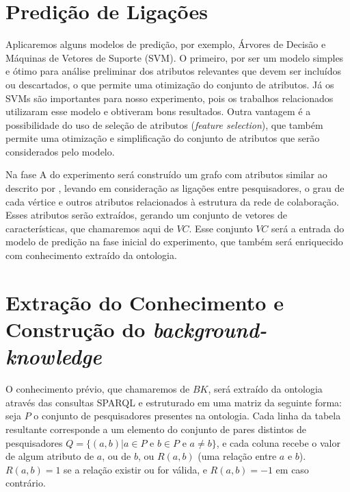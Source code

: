 \section{Predição de Ligações}
\label{sec:desenvolvimento-predicao}

Aplicaremos alguns modelos de predição, por exemplo, Árvores de Decisão e  Máquinas de Vetores de Suporte (SVM). O primeiro, por ser um modelo simples e ótimo para análise preliminar dos atributos relevantes que devem ser incluídos ou descartados, o que permite uma otimização do conjunto de atributos. Já os SVMs são importantes para nosso experimento, pois os trabalhos relacionados utilizaram esse modelo e obtiveram bons resultados. Outra vantagem é a possibilidade do uso de seleção de atributos (\textit{feature selection}), que também permite uma otimização e simplificação do conjunto de atributos que serão considerados pelo modelo.

Na fase A do experimento será construído um grafo com atributos similar ao descrito por \citet{Cervantes2014}, levando em consideração as ligações entre pesquisadores, o grau de cada vértice e outros atributos relacionados à estrutura da rede de colaboração. Esses atributos serão extraídos, gerando um conjunto de vetores de características, que chamaremos aqui de $VC$. Esse conjunto $VC$ será a entrada do modelo de predição na fase inicial do experimento, que também será enriquecido com conhecimento extraído da ontologia.

\section{Extração do Conhecimento e Construção do \textit{background-knowledge}}
\label{sec:desenvolvimento-background-knowledge}

O conhecimento prévio, que chamaremos de $BK$, será extraído da ontologia através das consultas SPARQL e estruturado em uma matriz da seguinte forma: seja $P$ o conjunto de pesquisadores presentes na ontologia. Cada linha da tabela resultante corresponde a um elemento do conjunto de pares distintos de pesquisadores $Q = \{ (a, b) | a \in P \text{ e } b \in P \text{ e } a \neq b \}$, e cada coluna recebe o valor de algum atributo de $a$, ou de $b$, ou $R(a,b)$ (uma relação entre $a$ e $b$). $R(a,b) = 1$ se a relação existir ou for válida, e $R(a,b) = -1$ em caso contrário.

